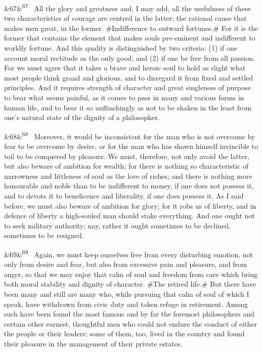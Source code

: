 \documentclass[12pt]{article}
\newcommand{\para}[1][]{\par\noindent\ifx&#1&\else\textsuperscript{\footnotesize #1}~\fi}
\begin{document}
\para[67] All the glory and greatness and, I may add, all the usefulness of these two characteristics of courage are centred in the latter; the rational cause that makes men great, in the former. \#Indifference to outward fortunes.\# For it is the former that contains the element that makes souls pre-eminent and indifferent to worldly fortune. And this quality is distinguished by two criteria: (1) if one account moral rectitude as the only good; and (2) if one be free from all passion. For we must agree that it takes a brave and heroic soul to hold as slight what most people think grand and glorious, and to disregard it from fixed and settled principles. And it requires strength of character and great singleness of purpose to bear what seems painful, as it comes to pass in many and various forms in human life, and to bear it so unflinchingly as not to be shaken in the least from one's natural state of the dignity of a philosopher.

\para[68] Moreover, it would be inconsistent for the man who is not overcome by fear to be overcome by desire, or for the man who has shown himself invincible to toil to be conquered by pleasure. We must, therefore, not only avoid the latter, but also beware of ambition for wealth; for there is nothing so characteristic of narrowness and littleness of soul as the love of riches; and there is nothing more honourable and noble than to be indifferent to money, if one does not possess it, and to devote it to beneficence and liberality, if one does possess it. As I said before, we must also beware of ambition for glory; for it robs us of liberty, and in defence of liberty a high-souled man should stake everything. And one ought not to seek military authority; nay, rather it ought sometimes to be declined, sometimes to be resigned.

\para[69] Again, we must keep ourselves free from every disturbing emotion, not only from desire and fear, but also from excessive pain and pleasure, and from anger, so that we may enjoy that calm of soul and freedom from care which bring both moral stability and dignity of character. \#The retired life.\# But there have been many and still are many who, while pursuing that calm of soul of which I speak, have withdrawn from civic duty and taken refuge in retirement. Among such have been found the most famous and by far the foremost philosophers and certain other earnest, thoughtful men who could not endure the conduct of either the people or their leaders; some of them, too, lived in the country and found their pleasure in the management of their private estates.
\end{document}
